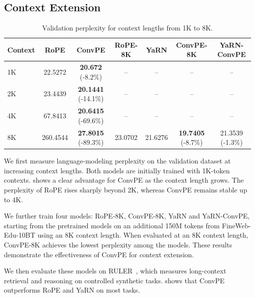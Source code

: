 \documentclass{article}
\begin{document}
\subsection{Context Extension}

\begin{table}[!ht]
\centering
\small
\begin{tabular}{lcccccc}
\toprule
Context & RoPE & ConvPE & RoPE-8K & YaRN & ConvPE-8K & YaRN-ConvPE \\
\midrule
1K & 22.5272 & \textbf{20.672} (-8.2\%) & -- & -- & -- & -- \\
2K & 23.4439 & \textbf{20.1441} (-14.1\%) & -- & -- & -- & -- \\
4K & 67.8413 & \textbf{20.6415} (-69.6\%) & -- & -- & -- & -- \\
8K & 260.4544 & \textbf{27.8015} (-89.3\%) & 23.0702 & 21.6276 & \textbf{19.7405} (-8.7\%) & 21.3539 (-1.3\%) \\
\bottomrule
\end{tabular}
\caption{Validation perplexity for context lengths from 1K to 8K.}
\label{tab:valppl}
\end{table}

We first measure language-modeling perplexity on the validation dataset at increasing context lengths. Both models are initially trained with 1K-token contexts.  shows a clear advantage for ConvPE as the context length grows. The perplexity of RoPE rises sharply beyond 2K, whereas ConvPE remains stable up to 4K. 

We further train four models: RoPE-8K, ConvPE-8K, YaRN and YaRN-ConvPE, starting from the pretrained models on an additional 150M tokens from FineWeb-Edu-10BT using an 8K context length. When evaluated at an 8K context length, ConvPE-8K achieves the lowest perplexity among the models. These results demonstrate the effectiveness of ConvPE for context extension.

We then evaluate these models on RULER~\cite{hsieh2024ruler}, which measures long-context retrieval and reasoning on controlled synthetic tasks.  shows that ConvPE outperforms RoPE and YaRN on most tasks.
\end{document}
